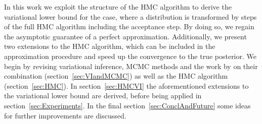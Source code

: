 In this work we exploit the structure of the HMC algorithm to derive the variational lower bound for the case, where a distribution is transformed by steps of the full HMC algorithm including the acceptance step. By doing so, we regain the asymptotic guarantee of a perfect approximation. Additionally, we present two extensions to the HMC algorithm, which can be included in the approximation procedure and speed up the convergence to the true posterior. We begin by revising variational inference, MCMC methods and the work by \textcite{Salimans2014} on their combination (section~\ref{sec:VIandMCMC}) as well as the HMC algorithm (section~\ref{sec:HMC}). In section~\ref{sec:HMCVI} the aforementioned extensions to the variational lower bound are derived, before being applied in section~\ref{sec:Experiments}. In the final section~\ref{sec:ConclAndFuture} some ideas for further improvements are discussed.